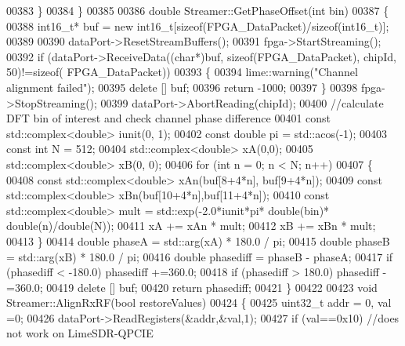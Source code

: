 \begin{DoxyCode}
00383     \}
00384 \}
00385 
00386 \textcolor{keywordtype}{double} Streamer::GetPhaseOffset(\textcolor{keywordtype}{int} bin)
00387 \{
00388     int16\_t* buf = \textcolor{keyword}{new} int16\_t[\textcolor{keyword}{sizeof}(FPGA_DataPacket)/\textcolor{keyword}{sizeof}(int16\_t)];
00389 
00390     dataPort->ResetStreamBuffers();
00391     fpga->StartStreaming();
00392     \textcolor{keywordflow}{if} (dataPort->ReceiveData((\textcolor{keywordtype}{char}*)buf, \textcolor{keyword}{sizeof}(FPGA_DataPacket), chipId, 50)!=\textcolor{keyword}{sizeof}(
      FPGA_DataPacket))
00393     \{
00394         lime::warning(\textcolor{stringliteral}{"Channel alignment failed"});
00395         \textcolor{keyword}{delete} [] buf;
00396         \textcolor{keywordflow}{return} -1000;
00397     \}
00398     fpga->StopStreaming();
00399     dataPort->AbortReading(chipId);
00400     \textcolor{comment}{//calculate DFT bin of interest and check channel phase difference}
00401     \textcolor{keyword}{const} std::complex<double> iunit(0, 1);
00402     \textcolor{keyword}{const} \textcolor{keywordtype}{double} pi = std::acos(-1);
00403     \textcolor{keyword}{const} \textcolor{keywordtype}{int} N = 512;
00404     std::complex<double> xA(0,0);
00405     std::complex<double> xB(0, 0);
00406     \textcolor{keywordflow}{for} (\textcolor{keywordtype}{int} n = 0; n < N; n++)
00407     \{
00408         \textcolor{keyword}{const} std::complex<double> xAn(buf[8+4*n], buf[9+4*n]);
00409         \textcolor{keyword}{const} std::complex<double> xBn(buf[10+4*n],buf[11+4*n]);
00410         \textcolor{keyword}{const} std::complex<double> mult = std::exp(-2.0*iunit*pi* \textcolor{keywordtype}{double}(bin)* \textcolor{keywordtype}{double}(n)/\textcolor{keywordtype}{double}(N));
00411         xA += xAn * mult;
00412         xB += xBn * mult;
00413     \}
00414     \textcolor{keywordtype}{double} phaseA = std::arg(xA) * 180.0 / pi;
00415     \textcolor{keywordtype}{double} phaseB = std::arg(xB) * 180.0 / pi;
00416     \textcolor{keywordtype}{double} phasediff = phaseB - phaseA;
00417     \textcolor{keywordflow}{if} (phasediff < -180.0) phasediff +=360.0;
00418     \textcolor{keywordflow}{if} (phasediff > 180.0) phasediff -=360.0;
00419     \textcolor{keyword}{delete} [] buf;
00420     \textcolor{keywordflow}{return} phasediff;
00421 \}
00422 
00423 \textcolor{keywordtype}{void} Streamer::AlignRxRF(\textcolor{keywordtype}{bool} restoreValues)
00424 \{
00425     uint32\_t addr = 0, val =0;
00426     dataPort->ReadRegisters(&addr,&val,1);
00427     \textcolor{keywordflow}{if} (val==0x10) \textcolor{comment}{//does not work on LimeSDR-QPCIE}

\end{DoxyCode}

